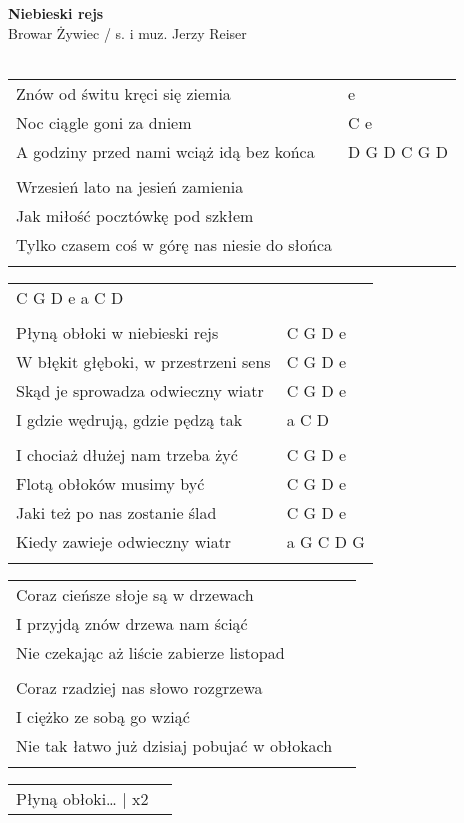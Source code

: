 \documentclass[a5paper]{article}
\begin{document}


\noindent
\fontsize{12pt}{15pt}\selectfont
\textbf{Niebieski rejs} \\
\fontsize{8pt}{10pt}\selectfont
Browar Żywiec / s. i muz. Jerzy Reiser \\ \\
\fontsize{10pt}{12pt}\selectfont
{}
\begin{tabular}{@{}p{8.00cm}p{3cm}@{}}
\noindent
Znów od świtu kręci się ziemia & e \\
Noc ciągle goni za dniem & C e \\
A godziny przed nami wciąż idą bez końca & D G  D  C G  D \\ \\
 
Wrzesień lato na jesień zamienia \\
Jak miłość pocztówkę pod szkłem \\
Tylko czasem coś w górę nas niesie do słońca \\ \\
\end{tabular}

\noindent
\begin{tabular}{@{}p{7.00cm}p{3cm}@{}}
C G  D e  a C  D \\ \\
Płyną obłoki w niebieski rejs & C G  D e \\
W błękit głęboki, w przestrzeni sens & C G  D e \\
Skąd je sprowadza odwieczny wiatr & C G  D e \\
I gdzie wędrują, gdzie pędzą tak & a C  D \\ \\

I chociaż dłużej nam trzeba żyć & C G  D e \\
Flotą obłoków musimy być & C G  D e \\
Jaki też po nas zostanie ślad & C G  D e \\
Kiedy zawieje odwieczny wiatr & a G C  D G \\ \\
\end{tabular}

\noindent
\begin{tabular}{@{}p{7.00cm}p{3cm}@{}}
Coraz cieńsze słoje są w drzewach \\
I przyjdą znów drzewa nam ściąć \\
Nie czekając aż liście zabierze listopad \\ \\
 
Coraz rzadziej nas słowo rozgrzewa \\
I ciężko ze sobą go wziąć \\
Nie tak łatwo już dzisiaj pobujać w obłokach \\ \\
\end{tabular}

\noindent
\begin{tabular}{@{}p{7.00cm}p{3cm}@{}} 
Płyną obłoki… | x2\\
\end{tabular}
\end{document}
